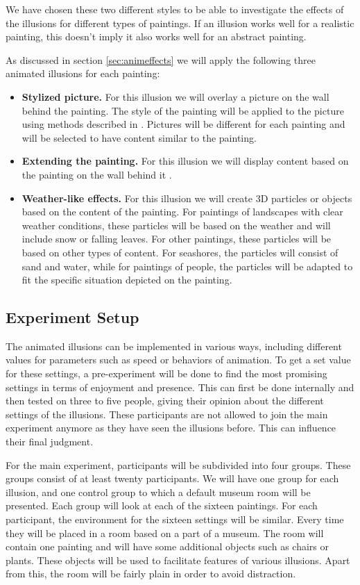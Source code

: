 \documentclass[a4paper]{article}
\begin{document}
We have chosen these two different styles to be able to investigate the effects of the illusions for different types of paintings. If an illusion works well for a realistic painting, this doesn't imply it also works well for an abstract painting.

As discussed in section \ref{sec:animeffects} we will apply the following three animated illusions for each painting:

\begin{itemize}
\item \textbf{Stylized picture.} For this illusion we will overlay a picture on the wall behind the painting. The style of the painting will be applied to the picture using methods described in \cite{gatys}. Pictures will be different for each painting and will be selected to have content similar to the painting.
\item \textbf{Extending the painting.} For this illusion we will display content based on the painting on the wall behind it \cite{inpainting}.
\item \textbf{Weather-like effects.} For this illusion we will create 3D particles or objects based on the content of the painting. For paintings of landscapes with clear weather conditions, these particles will be based on the weather and will include snow or falling leaves. For other paintings, these particles will be based on other types of content. For seashores, the particles will consist of sand and water, while for paintings of people, the particles will be adapted to fit the specific situation depicted on the painting.
\end{itemize}

\subsection{Experiment Setup}

The animated illusions can be implemented in various ways, including different values for parameters such as speed or behaviors of animation. To get a set value for these settings, a pre-experiment will be done to find the most promising settings in terms of enjoyment and presence. This can first be done internally and then tested on three to five people, giving their opinion about the different settings of the illusions. These participants are not allowed to join the main experiment anymore as they have seen the illusions before. This can influence their final judgment.

For the main experiment, participants will be subdivided into four groups. These groups consist of at least twenty participants. We will have one group for each illusion, and one control group to which a default museum room will be presented. Each group will look at each of the sixteen paintings. 
For each participant, the environment for the sixteen settings will be similar. Every time they will be placed in a room based on a part of a museum. The room will contain one painting and will have some additional objects such as chairs or plants. These objects will be used to facilitate features of various illusions. Apart from this, the room will be fairly plain in order to avoid distraction.
\end{document}

